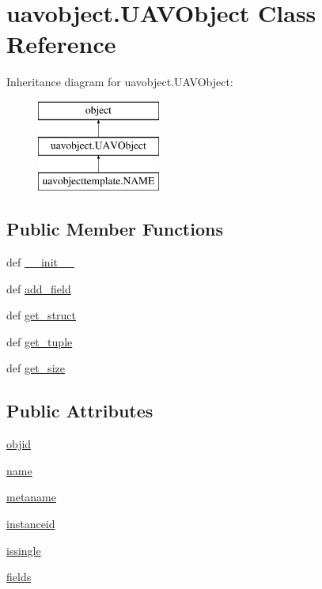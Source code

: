 \hypertarget{classuavobject_1_1_u_a_v_object}{\section{uavobject.\-U\-A\-V\-Object Class Reference}
\label{classuavobject_1_1_u_a_v_object}
}
Inheritance diagram for uavobject.\-U\-A\-V\-Object\-:\begin{figure}[H]
\begin{center}
\leavevmode
\includegraphics[height=3.000000cm]{classuavobject_1_1_u_a_v_object}
\end{center}
\end{figure}
\subsection*{Public Member Functions}
\begin{DoxyCompactItemize}
\item 
def \hyperlink{classuavobject_1_1_u_a_v_object_a6744d21db1b6b3009810ccc3699de1e9}{\-\_\-\-\_\-init\-\_\-\-\_\-}
\item 
def \hyperlink{classuavobject_1_1_u_a_v_object_ae767bb2ed6b584dce14d7dbb702730d5}{add\-\_\-field}
\item 
def \hyperlink{classuavobject_1_1_u_a_v_object_a3630e10e7bad50b6f2a03b22fd8616ba}{get\-\_\-struct}
\item 
def \hyperlink{classuavobject_1_1_u_a_v_object_a9419e3f1febc2de7b09a3b52028b8a36}{get\-\_\-tuple}
\item 
def \hyperlink{classuavobject_1_1_u_a_v_object_a52fe6009add2d12cfcf07f31a65b55c8}{get\-\_\-size}
\end{DoxyCompactItemize}
\subsection*{Public Attributes}
\begin{DoxyCompactItemize}
\item 
\hyperlink{classuavobject_1_1_u_a_v_object_a3b1453f9df2858ac082089867cc91667}{objid}
\item 
\hyperlink{classuavobject_1_1_u_a_v_object_a18e778e490804c6beb88c60b40e6cf70}{name}
\item 
\hyperlink{classuavobject_1_1_u_a_v_object_af6ccf832bcb7ad216b1b7e5461ceb39e}{metaname}
\item 
\hyperlink{classuavobject_1_1_u_a_v_object_a012fd4a0732970d3c5c010b073ad8f94}{instanceid}
\item 
\hyperlink{classuavobject_1_1_u_a_v_object_af380208f7a1b06c39870e351d7dfc803}{issingle}
\item 
\hyperlink{classuavobject_1_1_u_a_v_object_af9ce81de37f806ae8b2b50bfa9e6c72b}{fields}
\end{DoxyCompactItemize}


